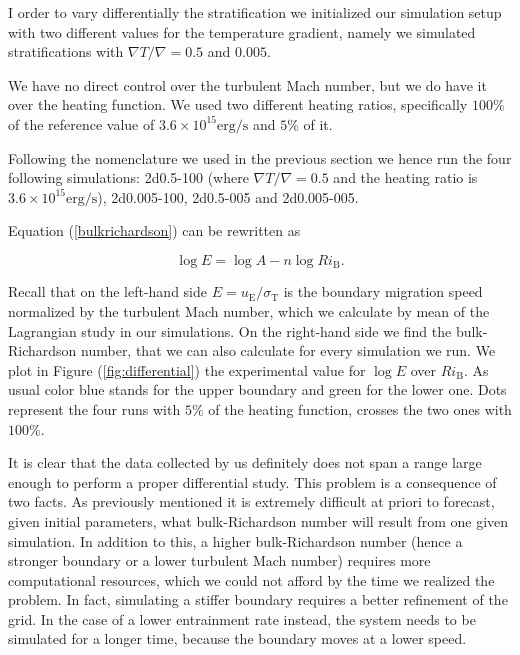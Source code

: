 I order to vary differentially the stratification we initialized our simulation setup with two different values for the temperature gradient, namely we simulated stratifications with $\nabla T / \nabla = 0.5$ and  $0.005$. 

We have no direct control over the turbulent Mach number, but we do have it over the heating function. We used two different heating ratios, specifically $100 \%$ of the reference value of $3.6 \times 10^{15} \mathrm{erg/s}$ and $5 \%$ of it.

Following the nomenclature we used in the previous section we hence run the four following simulations: 2d0.5-100 (where $\nabla T / \nabla = 0.5$ and the heating ratio is  $3.6 \times 10^{15} \mathrm{erg/s}$), 2d0.005-100, 2d0.5-005 and 2d0.005-005.

Equation (\ref{bulkrichardson}) can be rewritten as

\begin{equation}\label{eq:logaritmicbulk}
	\log{E} = \log{A} - n \log{Ri_{\mathrm{B}}}.
\end{equation}

Recall that on the left-hand side $E=u_{\mathrm{E}}/\sigma_{\mathrm{T}}$ is the boundary migration speed normalized by the turbulent Mach number, which we calculate by mean of the Lagrangian study in our simulations. On the right-hand side we find the bulk-Richardson number, that we can also calculate for every simulation we run. We plot in Figure (\ref{fig:differential}) the experimental value for $\log E$ over $Ri_{\mathrm{B}}$. As usual color blue stands for the upper boundary and green for the lower one. Dots represent the four runs with $5 \%$ of the heating function, crosses the two ones with $100 \%$.

It is clear that the data collected by us definitely does not span a range large enough to perform a proper differential study. This problem is a consequence of two facts. As previously mentioned it is extremely difficult at priori to forecast, given initial parameters, what bulk-Richardson number will result from one given simulation. In addition to this, a higher bulk-Richardson number (hence a stronger boundary or a lower turbulent Mach number) requires more computational resources, which we could not afford by the time we realized the problem. In fact, simulating a stiffer boundary requires a better refinement of the grid. In the case of a lower entrainment rate instead, the system needs to be simulated for a longer time, because the boundary moves at a lower speed.

